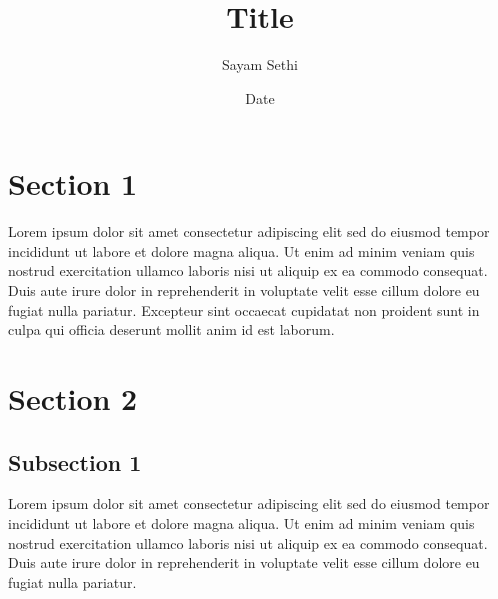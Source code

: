 \documentclass[11pt]{article}
\title{Title}
\author{Sayam Sethi}
\date{Date}
\begin{document}
\maketitle

\tableofcontents

\section{Section 1}
Lorem ipsum dolor sit amet consectetur adipiscing elit sed do eiusmod tempor incididunt ut labore et dolore magna aliqua. Ut enim ad minim veniam quis nostrud exercitation ullamco laboris nisi ut aliquip ex ea commodo consequat. Duis aute irure dolor in reprehenderit in voluptate velit esse cillum dolore eu fugiat nulla pariatur. Excepteur sint occaecat cupidatat non proident sunt in culpa qui officia deserunt mollit anim id est laborum.

\section{Section 2}
\subsection{Subsection 1}
Lorem ipsum dolor sit amet consectetur adipiscing elit sed do eiusmod tempor incididunt ut labore et dolore magna aliqua. Ut enim ad minim veniam quis nostrud exercitation ullamco laboris nisi ut aliquip ex ea commodo consequat. Duis aute irure dolor in reprehenderit in voluptate velit esse cillum dolore eu fugiat nulla pariatur.
\end{document}
